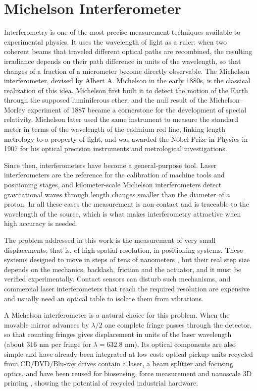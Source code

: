 \chapter{Michelson Interferometer}

Interferometry is one of the most precise measurement techniques available to experimental physics. It uses the wavelength of light as a ruler: when two coherent beams that traveled different optical paths are recombined, the resulting irradiance depends on their path difference in units of the wavelength, so that changes of a fraction of a micrometer become directly observable. The Michelson interferometer, devised by Albert A. Michelson in the early 1880s, is the classical realization of this idea. Michelson first built it to detect the motion of the Earth through the supposed luminiferous ether, and the null result of the Michelson--Morley experiment of 1887 became a cornerstone for the development of special relativity. Michelson later used the same instrument to measure the standard meter in terms of the wavelength of the cadmium red line, linking length metrology to a property of light, and was awarded the Nobel Prize in Physics in 1907 for his optical precision instruments and metrological investigations.

Since then, interferometers have become a general-purpose tool. Laser interferometers are the reference for the calibration of machine tools and positioning stages, and kilometer-scale Michelson interferometers detect gravitational waves through length changes smaller than the diameter of a proton. In all these cases the measurement is non-contact and is traceable to the wavelength of the source, which is what makes interferometry attractive when high accuracy is needed.

The problem addressed in this work is the measurement of very small displacements, that is, of high spatial resolution, in positioning systems. These systems designed to move in steps of tens of nanometers \cite{mengOpenFlexureBlockStage2020, liaoDesignTestingCompliant2024,liaoLowcostOpensourceXYZ2022}, but their real step size depends on the mechanics, backlash, friction and the actuator, and it must be verified experimentally. Contact sensors can disturb such mechanisms, and commercial laser interferometers that reach the required resolution are expensive and usually need an optical table to isolate them from vibrations.

A Michelson interferometer is a natural choice for this problem. When the movable mirror advances by $\lambda/2$ one complete fringe passes through the detector, so that counting fringes gives displacement in units of the laser wavelength (about $316\text{ nm}$ per fringe for $\lambda = 632.8\text{ nm}$). Its optical components are also simple and have already been integrated at low cost: optical pickup units recycled from CD/DVD/Blu-ray drives contain a laser, a beam splitter and focusing optics, and have been reused for biosensing, force measurement and nanoscale 3D printing \cite{hwuHackingCDDVD2018, changOpensourceForceAnalyzer2022, changMicroNanoscale3D2021}, showing the potential of recycled industrial hardware.

